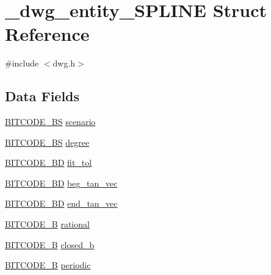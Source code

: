 \hypertarget{struct__dwg__entity__SPLINE}{\section{\-\_\-dwg\-\_\-entity\-\_\-\-S\-P\-L\-I\-N\-E \-Struct \-Reference}
\label{struct__dwg__entity__SPLINE}
}


{\ttfamily \#include $<$dwg.\-h$>$}

\subsection*{\-Data \-Fields}
\begin{DoxyCompactItemize}
\item 
\hyperlink{dwg_8h_a94297606fbd4a4ff97e8add284af0809}{\-B\-I\-T\-C\-O\-D\-E\-\_\-\-B\-S} \hyperlink{struct__dwg__entity__SPLINE_aef993ae95cbb3dba70db37c3c4b6df70}{scenario}
\item 
\hyperlink{dwg_8h_a94297606fbd4a4ff97e8add284af0809}{\-B\-I\-T\-C\-O\-D\-E\-\_\-\-B\-S} \hyperlink{struct__dwg__entity__SPLINE_a01b15383e132dc1259cd1ae72ca53fbc}{degree}
\item 
\hyperlink{dwg_8h_a3c1e6781466b74ba07785d57da70ed97}{\-B\-I\-T\-C\-O\-D\-E\-\_\-\-B\-D} \hyperlink{struct__dwg__entity__SPLINE_a5add3bd8d8c257634f7b0c89e12333fb}{fit\-\_\-tol}
\item 
\hyperlink{dwg_8h_a00698ef1bb072aa0a9360c6fc1c57587}{\-B\-I\-T\-C\-O\-D\-E\-\_\-B\-D} \hyperlink{struct__dwg__entity__SPLINE_a3c6dac0c22e4c80ce6c49bdd7469f25a}{beg\-\_\-tan\-\_\-vec}
\item 
\hyperlink{dwg_8h_a00698ef1bb072aa0a9360c6fc1c57587}{\-B\-I\-T\-C\-O\-D\-E\-\_\-B\-D} \hyperlink{struct__dwg__entity__SPLINE_a7989ad4bb414dbcd8dfced9f63a7e659}{end\-\_\-tan\-\_\-vec}
\item 
\hyperlink{dwg_8h_ab533b1f62d9086749e3bb5b67e9f224e}{\-B\-I\-T\-C\-O\-D\-E\-\_\-\-B} \hyperlink{struct__dwg__entity__SPLINE_abf9411f36ae47d47f230e533e481de25}{rational}
\item 
\hyperlink{dwg_8h_ab533b1f62d9086749e3bb5b67e9f224e}{\-B\-I\-T\-C\-O\-D\-E\-\_\-\-B} \hyperlink{struct__dwg__entity__SPLINE_a0cbf727f2ae880b349e855e4af9f272d}{closed\-\_\-b}
\item 
\hyperlink{dwg_8h_ab533b1f62d9086749e3bb5b67e9f224e}{\-B\-I\-T\-C\-O\-D\-E\-\_\-\-B} \hyperlink{struct__dwg__entity__SPLINE_ada89ca55db0f885bb458161114640b7e}{periodic}
\item 

\end{DoxyCompactItemize}
